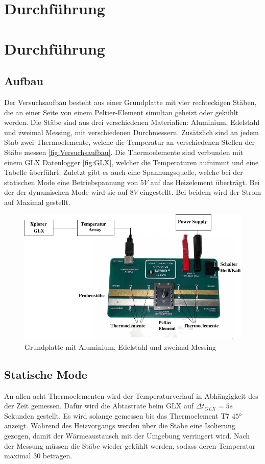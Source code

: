 \section{Durchführung}
\label{sec:Durchführung}
\section{Durchführung}
\label{sec:Durchführung}

\subsection{Aufbau}
Der Versuchsaufbau besteht aus einer Grundplatte mit vier rechteckigen Stäben, die an einer Seite von einem Peltier-Element simultan geheizt oder gekühlt werden.
Die Stäbe sind aus drei verschiedenen Materialien:  Aluminium, Edelstahl und zweimal Messing, mit verschiedenen Durchmessern.
Zusätzlich sind an jedem Stab zwei Thermoelemente, welche die Temperatur an verschiedenen Stellen der Stäbe messen \autoref{fig:Versuchsaufbau}.
Die Thermoelemente sind verbunden mit einem GLX Datenlogger \autoref{fig:GLX}, welcher die Temperaturen aufnimmt und eine Tabelle überführt.
Zuletzt gibt es auch eine Spannungsquelle, welche bei der statischen Mode eine Betriebspannung von $5\si{V}$ auf das Heizelement überträgt. 
Bei der der dynamischen Mode wird sie auf $8\si{V}$ eingestellt. Bei beidem wird der Strom auf Maximal gestellt.

\begin{figure}[H]
    \centering
    \includegraphics{content/Abb_1.pdf}
    \caption{Grundplatte mit Aluminium, Edelstahl und zweimal Messing\cite[3]{V204}}
    \label{fig:Versuchsaufbau}
\end{figure}

\subsection{Statische Mode}
An allen acht Thermoelementen wird der Temperaturverlauf in Abhängigkeit des der Zeit gemessen.
Dafür wird die Abtastrate beim GLX auf $\Delta t_{GLX} = 5\si{s}$ Sekunden gestellt.
Es wird solange gemessen bis das Thermoelement T7 $45°$ anzeigt.
Während des Heizvorgangs werden über die Stäbe eine Isolierung gezogen, damit der Wärmeaustausch mit der Umgebung verringert wird.
Nach der Messung müssen die Stäbe wieder gekühlt werden, sodass deren Temperatur maximal $30$ betragen.

